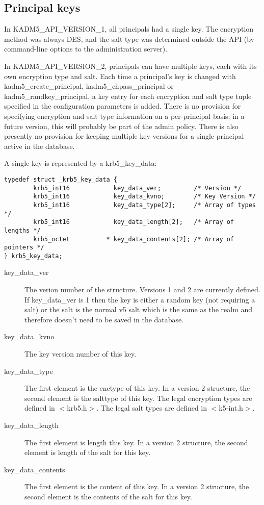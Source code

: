 \subsection{Principal keys}
\label{sec:keys}

In KADM5_API_VERSION_1, all principals had a single key.  The
encryption method was always DES, and the salt type was determined
outside the API (by command-line options to the administration
server).

In KADM5_API_VERSION_2, principals can have multiple keys, each with
its own encryption type and salt.  Each time a principal's key is
changed with kadm5_create_principal, kadm5_chpass_principal or
kadm5_randkey_principal, a key entry for each encryption and salt type
tuple specified in the configuration parameters is added.  There is no
provision for specifying encryption and salt type information on a
per-principal basis; in a future version, this will probably be part
of the admin policy.  There is also presently no provision for keeping
multiple key versions for a single principal active in the database.

A single key is represented by a krb5_key_data:
%
\begin{verbatim}
typedef struct _krb5_key_data {
        krb5_int16            key_data_ver;         /* Version */
        krb5_int16            key_data_kvno;        /* Key Version */
        krb5_int16            key_data_type[2];     /* Array of types */
        krb5_int16            key_data_length[2];   /* Array of lengths */
        krb5_octet          * key_data_contents[2]; /* Array of pointers */
} krb5_key_data;
\end{verbatim}
%
\begin{description}
\item[key_data_ver] The verion number of the structure.  Versions 1
and 2 are currently defined.  If key_data_ver is 1 then the key is
either a random key (not requiring a salt) or the salt is the normal
v5 salt which is the same as the realm and therefore doesn't need to
be saved in the database.

\item[key_data_kvno] The key version number of this key.

\item[key_data_type] The first element is the enctype of this key.  In
a version 2 structure, the second element is the salttype of this key.
The legal encryption types are defined in $<$krb5.h$>$.  The legal
salt types are defined in $<$k5-int.h$>$.

\item[key_data_length] The first element is length this key.  In a
version 2 structure, the second element is length of the salt for this
key.

\item[key_data_contents] The first element is the content of this key.
In a version 2 structure, the second element is the contents of the
salt for this key.
\end{description}

